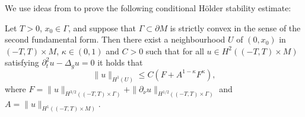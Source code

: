 \documentclass[final,leqno]{siamart1116}
\begin{document}
We use ideas from \cite{Isakov2010, Stefanov2013} to prove the
following conditional H\"older stability estimate:

\begin{lemma}
\label{lemma:HolderTypeStability}
Let $T > 0$, $x_0 \in \Gamma$, and suppose that $\Gamma \subset {\partial} M$ is strictly convex
in the sense of the second fundamental form. 
Then there exist a neighbourhood 
$U$ of $(0,x_0)$ in $(-T,T) \times M$,
$\kappa \in (0,1)$ and $C > 0$
such that for all $u \in H^2((-T,T) \times M)$
satisfying ${\partial}_t^2 u - \Delta_g u = 0$
it holds that 
\begin{equation}
\label{eqn:HolderTypeStability}
\|u\|_{H^1\left(U\right)} \leq C(F + A^{1 - \kappa} F^{\kappa}),
\end{equation}
where 
$F =\|u\|_{H^{3/2}((-T,T) \times \Gamma)} + \|{\partial}_\nu u\|_{H^{1/2}((-T,T) \times \Gamma)}$ and 
$A = \|u\|_{H^1((-T,T) \times M)}$.
\end{lemma}  
\end{document}
